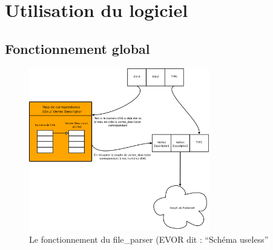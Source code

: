 \section{Utilisation du logiciel}
\subsection{Fonctionnement global}

\begin{figure}[!ht]
\begin{center}
        \includegraphics[width=0.7\textwidth]{./schema/file_parser.png}
\caption{Le fonctionnement du file\_parser (EVOR dit : ``Sch\'ema useless'' }
\label{file_parser}
\end{center}
\end{figure}


